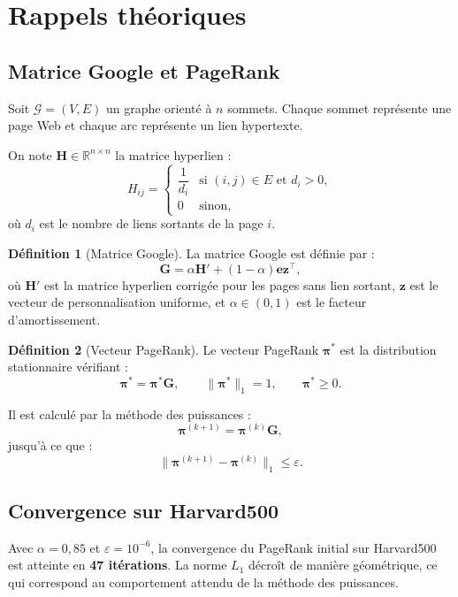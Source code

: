 \documentclass[12pt,a4paper]{article}
\newcommand{\vpi}{\boldsymbol{\pi}}
\newcommand{\G}{\mathbf{G}}
\newcommand{\Hmat}{\mathbf{H}}
\theoremstyle{definition}
\newtheorem{definition}{Définition}
\begin{document}
\section{Rappels théoriques}

\subsection{Matrice Google et PageRank}

Soit $\mathcal{G}=(V,E)$ un graphe orienté à $n$ sommets. Chaque sommet
représente une page Web et chaque arc représente un lien hypertexte.

On note $\Hmat \in \mathbb{R}^{n\times n}$ la matrice hyperlien :
\[
H_{ij} =
\begin{cases}
\dfrac{1}{d_i} & \text{si } (i,j)\in E \text{ et } d_i>0,\\[6pt]
0 & \text{sinon,}
\end{cases}
\]
où $d_i$ est le nombre de liens sortants de la page $i$.

\begin{definition}[Matrice Google]
La matrice Google est définie par :
\[
  \G = \alpha \Hmat' + (1-\alpha)\mathbf{e}\mathbf{z}^{\top},
\]
où $\Hmat'$ est la matrice hyperlien corrigée pour les pages sans lien sortant,
$\mathbf{z}$ est le vecteur de personnalisation uniforme, et
$\alpha\in(0,1)$ est le facteur d'amortissement.
\end{definition}

\begin{definition}[Vecteur PageRank]
Le vecteur PageRank $\vpi^*$ est la distribution stationnaire vérifiant :
\[
  \vpi^* = \vpi^*\G,
  \qquad
  \|\vpi^*\|_1=1,
  \qquad
  \vpi^*\geq 0.
\]
\end{definition}

Il est calculé par la méthode des puissances :
\[
  \vpi^{(k+1)}=\vpi^{(k)}\G,
\]
jusqu'à ce que :
\[
  \|\vpi^{(k+1)}-\vpi^{(k)}\|_1 \leq \varepsilon.
\]

\subsection{Convergence sur Harvard500}

Avec $\alpha=0{,}85$ et $\varepsilon=10^{-6}$, la convergence du PageRank initial
sur Harvard500 est atteinte en \textbf{47 itérations}. La norme $L_1$ décroît
de manière géométrique, ce qui correspond au comportement attendu de la méthode
des puissances.
\end{document}
